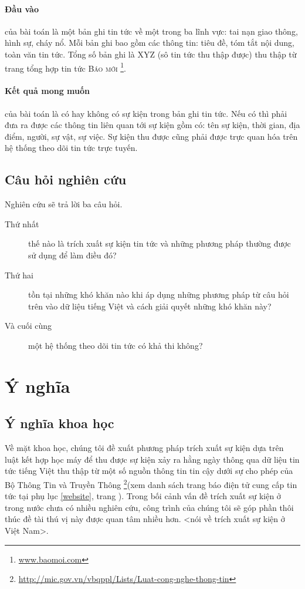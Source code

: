 \paragraph{Đầu vào} của bài toán là một bản ghi tin tức về một trong  ba lĩnh vực: tai nạn giao thông, hình sự, cháy nổ. Mỗi bản ghi bao gồm các thông tin: tiêu đề, tóm tắt nội dung, toàn văn tin tức. Tổng số bản ghi là XYZ (sô tin tức thu thập được) thu thập từ trang tổng hợp tin tức \textsc{Báo mới} \footnote{\href{www.baomoi.com}{www.baomoi.com}}.

\paragraph{Kết quả mong muốn} của bài toán là có hay không có sự kiện trong bản ghi tin tức. Nếu có thì phải đưa ra được các thông tin liên quan tới sự kiện gồm có: tên sự kiện, thời gian, địa điểm, người, sự vật, sự việc. Sự kiện thu được cũng phải được trực quan hóa trên hệ thống theo dõi tin tức trực tuyến.
    \subsection{Câu hỏi nghiên cứu}
 \noindent Nghiên cứu sẽ trả lời ba câu hỏi.
 \begin{description}
 \item[Thứ nhất] thế nào là trích xuất sự kiện tin tức và những phương pháp thường được sử dụng để làm điều đó?
\item[Thứ hai] tồn tại những khó khăn nào  khi áp dụng những phương pháp từ câu hỏi trên vào dữ liệu tiếng Việt và cách giải quyết những khó khăn này?
\item[Và cuối cùng] một hệ thống theo dõi tin tức có khả thi không?
 \end{description}

\section{Ý nghĩa}
    \label{meaning}
    \subsection{Ý nghĩa khoa học}

\noindent Về mặt khoa học, chúng tôi đề xuất phương pháp trích xuất sự kiện dựa trên luật kết hợp học máy để thu được sự kiện xảy ra hằng ngày thông qua  dữ liệu tin tức tiếng Việt thu thập từ một số nguồn thông tin tin cậy dưới sự cho phép của Bộ Thông Tin và Truyền Thông \footnote{\href{http://mic.gov.vn/vbqppl/Lists/Vn$\%$20bn$\%$20QPPL/DispForm.aspx?ID=6988}{http://mic.gov.vn/vbqppl/Lists/Luat-cong-nghe-thong-tin}}(xem danh sách trang báo điện tử cung cấp tin tức tại  phụ lục \ref{website}, trang \pageref{website}). Trong bối cảnh vấn đề trích xuất sự kiện ở trong nước chưa có nhiều nghiên cứu, công trình của chúng tôi sẽ góp phần thôi thúc đề tài thú vị này được quan tâm nhiều hơn.
<nói về trích xuất sự kiện ở Việt Nam>.

